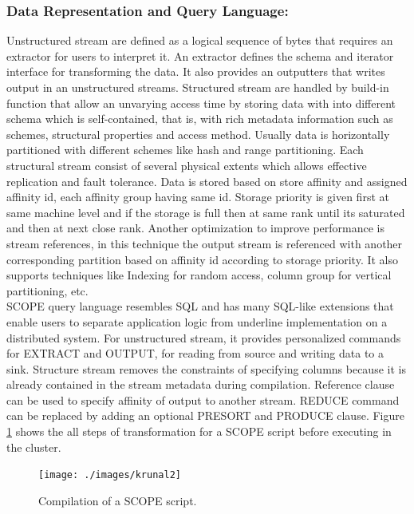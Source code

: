 \documentclass[runningheads,a4paper]{llncs}
\begin{document}
{\subsubsection*{Data Representation and Query Language: }
Unstructured stream are defined as a logical sequence of bytes that requires an extractor for users to interpret it. An extractor defines the schema and iterator interface for transforming the data. It also provides an outputters that writes output in an unstructured streams. Structured stream are handled by build-in function that allow an unvarying access time by storing data with into different schema which is self-contained, that is, with rich metadata information such as schemes, structural properties and access method. Usually data is horizontally partitioned with different schemes like hash and range partitioning. Each structural stream consist of several physical extents which allows effective replication and fault tolerance. Data is stored based on store affinity and assigned affinity id, each affinity group having same id. Storage priority is given first at same machine level and if the storage is full then at same rank until its saturated and then at next close rank.  Another optimization to improve performance is stream references, in this technique the output stream is referenced with another corresponding partition based on affinity id according to storage priority. It also supports techniques like Indexing for random access, column group for vertical partitioning, etc.  \\

SCOPE query language resembles SQL and has many SQL-like extensions that enable users to separate application logic from underline implementation on a distributed system. For unstructured stream, it provides personalized commands for EXTRACT and OUTPUT, for reading from source and writing data to a sink. Structure stream removes the constraints of specifying columns because it is already contained in the stream metadata during compilation. Reference clause can be used to specify affinity of output to another stream. REDUCE command can be replaced by adding an optional PRESORT and PRODUCE clause. Figure \ref{fig:compilation_of_a_scope} shows the all steps of transformation for a SCOPE script before executing in the cluster. 

\begin{figure}[!htb]
	\texttt{[image: ./images/krunal2]}
	\centering
	\caption{Compilation of a SCOPE script.}
	\label{fig:compilation_of_a_scope}
\end{figure}

}
\end{document}
